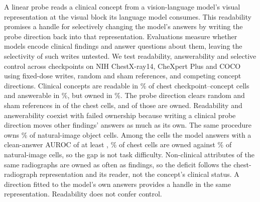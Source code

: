 A linear probe reads a clinical concept from a vision-language model's visual representation at the visual block its language model consumes. This readability promises a handle for selectively changing the model's answers by writing the probe direction back into that representation. Evaluations measure whether models encode clinical findings and answer questions about them, leaving the selectivity of such writes untested. We test readability, answerability and selective control across \cfCheckpoints{} checkpoints on NIH ChestX-ray14, CheXpert Plus and COCO using fixed-dose writes, random and sham references, and competing concept directions. Clinical concepts are readable in \cfChestReadablePct{}\% of chest checkpoint--concept cells and answerable in \cfChestAnswerablePct{}\%, but owned in \cfChestOwnedPct{}\%. The probe direction clears random and sham references in \cfChestRefMet{} of the chest cells, and \cfChestOwned{} of those are owned. Readability and answerability coexist with failed ownership because writing a clinical probe direction moves other findings' answers as much as its own. The same procedure owns \cfCocoOwnedPct{}\% of natural-image object cells. Among the cells the model answers with a clean-answer AUROC of at least \cfStratTopEdge{}, \cfStratChestTopPct{}\% of chest cells are owned against \cfStratNatTopPct{}\% of natural-image cells, so the gap is not task difficulty. Non-clinical attributes of the same radiographs are owned as often as findings, so the deficit follows the chest-radiograph representation and its reader, not the concept's clinical status. A direction fitted to the model's own answers provides a handle in the same representation. Readability does not confer control.
